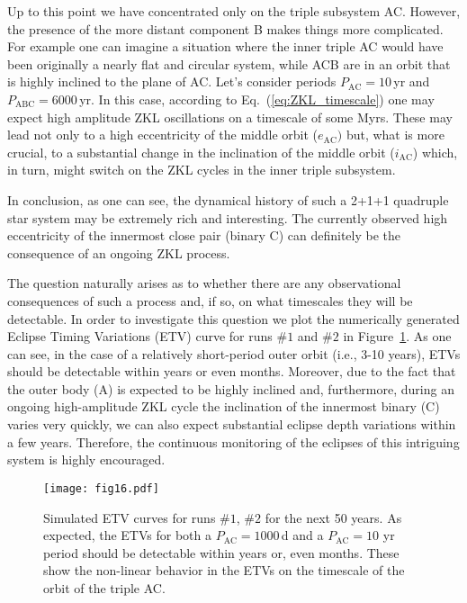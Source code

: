 \documentclass[fleqn,usenatbib]{mnras} %
\begin{document}
Up to this point we have concentrated only on the triple subsystem AC. However, the presence of the more distant component B makes things more complicated. For example one can imagine a situation where the inner triple AC would have been originally a nearly flat and circular system, while ACB are in an orbit that is highly inclined to the plane of AC. Let's consider periods $P_\mathrm{AC}=10$\,yr and $P_\mathrm{ABC}=6000$\,yr. In this case, according to Eq.~(\ref{eq:ZKL_timescale}) one may expect high amplitude ZKL oscillations on a timescale of some Myrs. These may lead not only to a high eccentricity of the middle orbit ($e_\mathrm{AC})$ but, what is more crucial, to a substantial change in the inclination of the middle orbit ($i_\mathrm{AC}$) which, in turn, might switch on the ZKL cycles in the inner triple subsystem.

In conclusion, as one can see, the dynamical history of such a 2+1+1 quadruple star system may be extremely rich and interesting.  The currently observed high eccentricity of the innermost close pair (binary C) can definitely be the consequence of an ongoing ZKL process.

The question naturally arises as to whether there are any observational consequences of such a process and, if so, on what timescales they will be detectable. In order to investigate this question we plot the numerically generated Eclipse Timing Variations (ETV) curve for runs $\#1$ and $\#2$ in Figure~\ref{fig:ZKL_ETV}. As one can see, in the case of a relatively short-period outer orbit (i.e., 3-10 years), ETVs should be detectable within years or even  months. Moreover, due to the fact that the outer body (A) is expected to be highly inclined and, furthermore, during an ongoing high-amplitude ZKL cycle the inclination of the innermost binary (C) varies very quickly, we can also expect substantial eclipse depth variations within a few years. Therefore, the continuous monitoring of the eclipses of this intriguing system is highly encouraged.

\begin{figure}
\centering
\texttt{[image: fig16.pdf]}
\caption{Simulated ETV curves for runs $\#1$, $\#2$ for the next 50 years. As expected, the ETVs for both a $P_\mathrm{AC}=1000$\,d and a $P_\mathrm{AC}=10$ yr period should be detectable within years or, even months. These show the non-linear behavior in the ETVs on the timescale of the orbit of the triple AC.}
\label{fig:ZKL_ETV}
\end{figure}
\end{document}
